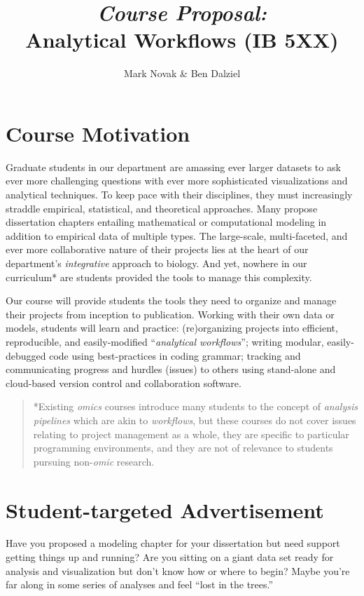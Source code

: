 \documentclass[10pt]{article}
\author{Mark Novak \& Ben Dalziel}
\title{\emph{Course Proposal:}\\Analytical Workflows (IB 5XX)}
\date{}
\begin{document}
\maketitle

\section*{Course Motivation}
Graduate students in our department are amassing ever larger datasets to ask ever more challenging questions with ever more sophisticated visualizations and analytical techniques.   To keep pace with their disciplines, they must increasingly straddle empirical, statistical, and theoretical approaches. Many propose dissertation chapters entailing mathematical or computational modeling in addition to empirical data of multiple types.  The large-scale, multi-faceted, and ever more collaborative nature of their projects lies at the heart of our department's \emph{integrative} approach to biology.  And yet, nowhere in our curriculum* are students provided the tools to manage this complexity.

Our course will provide students the tools they need to organize and manage their projects from inception to publication.  Working with their own data or models, students will learn and practice: (re)organizing projects into efficient, reproducible, and easily-modified ``\emph{analytical workflows}''; writing modular, easily-debugged code using best-practices in coding grammar; tracking and communicating progress and hurdles (issues) to others using stand-alone and cloud-based version control and collaboration software.

\begin{quote}
	*Existing \emph{omics} courses introduce many students to the concept of \emph{analysis pipelines} which are akin to \emph{workflows}, but these courses do not cover issues relating to project management as a whole, they are specific to particular programming environments, and they are not of relevance to students pursuing non-\emph{omic} research.
\end{quote}


\section*{Student-targeted Advertisement}
Have you proposed a modeling chapter for your dissertation but need support getting things up and running?  Are you sitting on a giant data set ready for analysis and visualization but don't know how or where to begin?  Maybe you're far along in some series of analyses and feel ``lost in the trees.''
\end{document}
